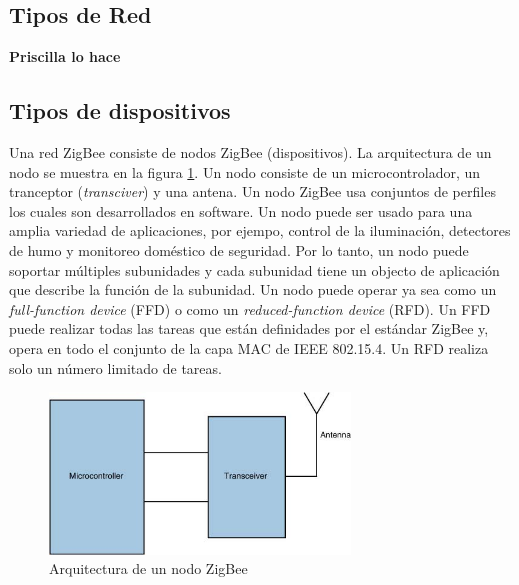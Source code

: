 \documentclass[10pt,journal,compsoc]{IEEEtran}
\begin{document}
\subsection{Tipos de Red}

\textbf{Priscilla lo hace}

\subsection{Tipos de dispositivos}
Una red ZigBee consiste de nodos ZigBee (dispositivos). La arquitectura de un nodo se muestra en la figura \ref{fig:device-architecture}. Un nodo consiste de un microcontrolador, un tranceptor (\emph{transciver}) y una antena. Un nodo ZigBee usa conjuntos de perfiles los cuales son desarrollados en software. Un nodo puede ser usado para una amplia variedad de aplicaciones, por ejempo, control de la iluminación, detectores de humo y monitoreo doméstico de seguridad. Por lo tanto, un nodo puede soportar múltiples subunidades y cada subunidad tiene un objecto de aplicación que describe la función de la subunidad. Un nodo puede operar ya sea como un \emph{full-function device} (FFD) o como un \emph{reduced-function device} (RFD). Un FFD puede realizar todas las tareas que están definidades por el estándar ZigBee y, opera en todo el conjunto de la capa MAC de IEEE 802.15.4. Un RFD realiza solo un número limitado de tareas.

\begin{figure}[h]
    \centering
    \includegraphics[width=8cm]{device-architecture}
    \caption{Arquitectura de un nodo ZigBee}
    \label{fig:device-architecture}
\end{figure}
\end{document}
